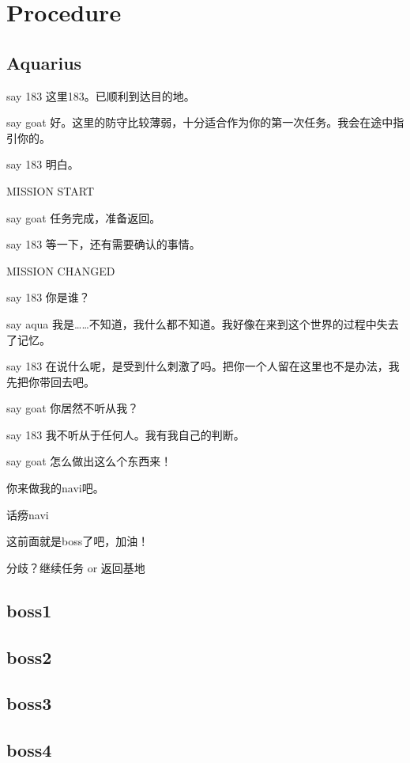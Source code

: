 \documentclass{article}
\begin{document}
\section{Procedure}



\subsection{Aquarius}

say 183 这里183。已顺利到达目的地。

say goat 好。这里的防守比较薄弱，十分适合作为你的第一次任务。我会在途中指引你的。

say 183 明白。

MISSION START

say goat 任务完成，准备返回。

say 183 等一下，还有需要确认的事情。

MISSION CHANGED

say 183 你是谁？

say aqua 我是……不知道，我什么都不知道。我好像在来到这个世界的过程中失去了记忆。

say 183 在说什么呢，是受到什么刺激了吗。把你一个人留在这里也不是办法，我先把你带回去吧。

say goat 你居然不听从我？

say 183 我不听从于任何人。我有我自己的判断。

say goat 怎么做出这么个东西来！

你来做我的navi吧。

话痨navi

这前面就是boss了吧，加油！

分歧？继续任务 or 返回基地

\subsection{boss1}

\subsection{boss2}

\subsection{boss3}

\subsection{boss4}
\end{document}
